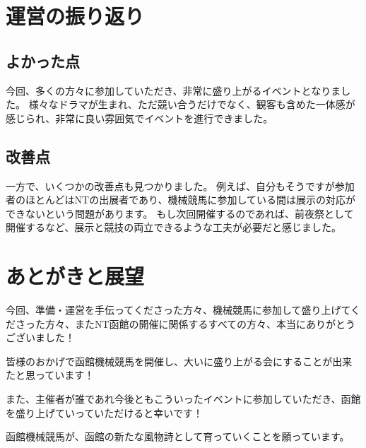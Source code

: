 \chapter{運営の振り返り}
\section{よかった点}
今回、多くの方々に参加していただき、非常に盛り上がるイベントとなりました。
様々なドラマが生まれ、ただ競い合うだけでなく、観客も含めた一体感が感じられ、非常に良い雰囲気でイベントを進行できました。

\section{改善点}
一方で、いくつかの改善点も見つかりました。
例えば、自分もそうですが参加者のほとんどはNTの出展者であり、機械競馬に参加している間は展示の対応ができないという問題があります。
もし次回開催するのであれば、前夜祭として開催するなど、展示と競技の両立できるような工夫が必要だと感じました。

\chapter{あとがきと展望}
今回、準備・運営を手伝ってくださった方々、機械競馬に参加して盛り上げてくださった方々、またNT函館の開催に関係するすべての方々、本当にありがとうございました！

皆様のおかげで函館機械競馬を開催し、大いに盛り上がる会にすることが出来たと思っています！

また、主催者が誰であれ今後ともこういったイベントに参加していただき、函館を盛り上げていっていただけると幸いです！

函館機械競馬が、函館の新たな風物詩として育っていくことを願っています。
